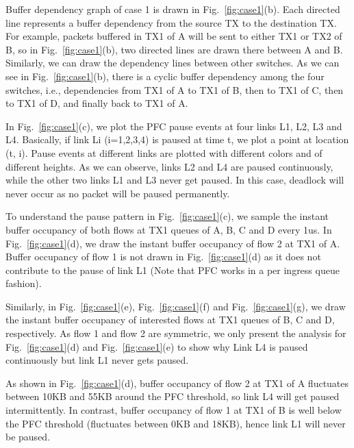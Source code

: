 Buffer dependency graph of case 1 is drawn in Fig.~\ref{fig:case1}(b). Each directed line represents 
a buffer dependency from the source TX to the destination TX. For example, packets buffered in TX1 of 
A will be sent to either TX1 or TX2 of B, so in Fig.~\ref{fig:case1}(b), two directed lines are drawn 
there between A and B. Similarly, we can draw the dependency lines between other switches. As we can 
see in Fig.~\ref{fig:case1}(b), there is a cyclic buffer dependency among the four switches, i.e., 
dependencies from TX1 of A to TX1 of B, then to TX1 of C, then to TX1 of D, and finally back to TX1 of A.

In Fig.~\ref{fig:case1}(c), we plot the PFC pause events at four links L1, L2, L3 and L4. Basically, 
if link Li (i=1,2,3,4) is paused at time t, we plot a point at location (t, i). Pause events at 
different links are plotted with different colors and of different heights. As we can observe, links 
L2 and L4 are paused continuously, while the other two links L1 and L3 never get paused. In this case, 
deadlock will never occur as no packet will be paused permanently.

To understand the pause pattern in Fig.~\ref{fig:case1}(c), we sample the instant buffer occupancy of 
both flows at TX1 queues of A, B, C and D every 1us. In Fig.~\ref{fig:case1}(d), we draw the instant 
buffer occupancy of flow 2 at TX1 of A. Buffer occupancy of flow 1 is not drawn in Fig.~\ref{fig:case1}(d) 
as it does not contribute to the pause of link L1 (Note that PFC works in a per ingress queue fashion). 

Similarly, in Fig.~\ref{fig:case1}(e), Fig.~\ref{fig:case1}(f) and Fig.~\ref{fig:case1}(g), we draw 
the instant buffer occupancy of interested flows at TX1 queues of B, C and D, respectively. As 
flow 1 and flow 2 are symmetric, we only present the analysis for Fig.~\ref{fig:case1}(d) and 
Fig.~\ref{fig:case1}(e) to show why Link L4 is paused continuously but link L1 never gets paused.

As shown in Fig.~\ref{fig:case1}(d), buffer occupancy of flow 2 at TX1 of A fluctuates between 10KB 
and 55KB around the PFC threshold, so link L4 will get paused intermittently. In contrast, buffer 
occupancy of flow 1 at TX1 of B is well below the PFC threshold (fluctuates between 0KB and 18KB), 
hence link L1 will never be paused.

